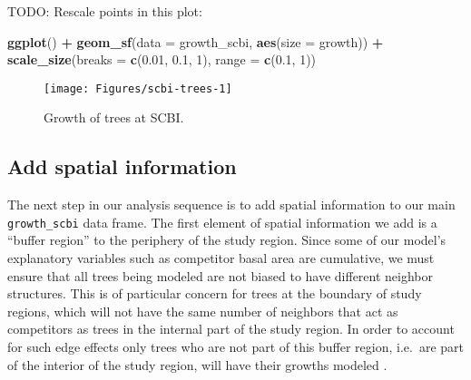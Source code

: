 \documentclass[12pt]{article}
\newenvironment{Shaded}{\begin{snugshade}}{\end{snugshade}}
\newcommand{\DataTypeTok}[1]{\textcolor[rgb]{0.13,0.29,0.53}{#1}}
\newcommand{\DecValTok}[1]{\textcolor[rgb]{0.00,0.00,0.81}{#1}}
\newcommand{\FloatTok}[1]{\textcolor[rgb]{0.00,0.00,0.81}{#1}}
\newcommand{\KeywordTok}[1]{\textcolor[rgb]{0.13,0.29,0.53}{\textbf{#1}}}
\newcommand{\NormalTok}[1]{#1}
\newcommand{\OperatorTok}[1]{\textcolor[rgb]{0.81,0.36,0.00}{\textbf{#1}}}
\newcommand{\StringTok}[1]{\textcolor[rgb]{0.31,0.60,0.02}{#1}}
\begin{document}
TODO: Rescale points in this plot:

\begin{Shaded}
\begin{Highlighting}[]
\KeywordTok{ggplot}\NormalTok{() }\OperatorTok{+}
\StringTok{  }\KeywordTok{geom_sf}\NormalTok{(}\DataTypeTok{data =}\NormalTok{ growth_scbi, }\KeywordTok{aes}\NormalTok{(}\DataTypeTok{size =}\NormalTok{ growth)) }\OperatorTok{+}\StringTok{ }
\StringTok{  }\KeywordTok{scale_size}\NormalTok{(}\DataTypeTok{breaks =} \KeywordTok{c}\NormalTok{(}\FloatTok{0.01}\NormalTok{, }\FloatTok{0.1}\NormalTok{, }\DecValTok{1}\NormalTok{), }\DataTypeTok{range =} \KeywordTok{c}\NormalTok{(}\FloatTok{0.1}\NormalTok{, }\DecValTok{1}\NormalTok{))}
\end{Highlighting}
\end{Shaded}

\begin{figure}

{\centering \texttt{[image: Figures/scbi-trees-1]} 

}

\caption{Growth of trees at SCBI.}\label{fig:scbi-trees}
\end{figure}

\hypertarget{spatial-information}{%
\subsection{Add spatial information}\label{spatial-information}}

The next step in our analysis sequence is to add spatial information to
our main \texttt{growth\_scbi} data frame. The first element of spatial
information we add is a ``buffer region'' to the periphery of the study
region. Since some of our model's explanatory variables such as
competitor basal area are cumulative, we must ensure that all trees
being modeled are not biased to have different neighbor structures. This
is of particular concern for trees at the boundary of study regions,
which will not have the same number of neighbors that act as competitors
as trees in the internal part of the study region. In order to account
for such edge effects only trees who are not part of this buffer region,
i.e.~are part of the interior of the study region, will have their
growths modeled \citet{waller_applied_2004}.
\end{document}
